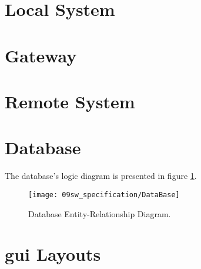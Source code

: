 \section{Local System}


\clearpage
\section{Gateway}


\clearpage
\section{Remote System}


\section{Database}

The database's logic diagram is presented in figure \ref{fig:database_er}.

\begin{figure}[H]
	\centering	
	\texttt{[image: 09sw\_specification/DataBase]}
	\caption{Database Entity-Relationship Diagram.}
	\label{fig:database_er}
\end{figure}



\section{\ac{gui} Layouts}






